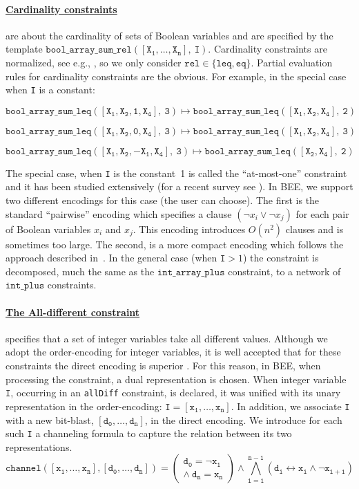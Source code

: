 \documentclass{tlp}
\newcommand{\bee}{\textsf{BEE}}
\begin{document}
\paragraph{\underline{Cardinality constraints}} are about the
cardinality of sets of Boolean variables and are specified by the
template $\mathtt{bool\_array\_sum\_rel([X_1,\ldots,X_n],~I)}$.
Cardinality constraints are normalized, see e.g., \cite{EenS06}, so we
only consider $\mathtt{rel\in\{leq,eq\}}$. Partial evaluation rules
for cardinality constraints are the obvious. For example, in the
special case when \texttt{I} is a constant:

$\mathtt{bool\_array\_sum\_leq([X_1,X_2,1,X_4],~3)\mapsto
  bool\_array\_sum\_leq([X_1,X_2,X_4],~2)}$

$\mathtt{bool\_array\_sum\_leq([X_1,X_2,0,X_4],~3)\mapsto
  bool\_array\_sum\_leq([X_1,X_2,X_4],~3)}$

$\mathtt{bool\_array\_sum\_leq([X_1,X_2,-X_1,X_4],~3)\mapsto
  bool\_array\_sum\_leq([X_2,X_4],~2)}$

\medskip\noindent 
The special case, when \texttt{I} is the constant~1 is called the
``at-most-one'' constraint and it has been studied extensively (for a
recent survey see \cite{Frisch+Giannaros/10/SAT}). In \bee, we support
two different encodings for this case (the user can choose). The first
is the standard ``pairwise'' encoding which specifies a clause $(\neg
x_i\vee\neg x_j)$ for each pair of Boolean variables $x_i$ and $x_j$.
This encoding introduces $O(n^2)$ clauses and is sometimes too large.
The second,  is a more compact encoding which follows
the approach described in~\cite{NewAtMostOne}.
In the general case (when $\mathtt{I}>1$) the constraint is
decomposed, much the same as the $\mathtt{int\_array\_plus}$
constraint, to a network of $\mathtt{int\_plus}$ constraints.

\paragraph{\underline{The All-different constraint}}
specifies that a set of integer variables take all different
values. Although we adopt the order-encoding for integer variables, it
is well accepted that for these constraints the direct encoding is
superior \cite{direct4allDiff}. For this reason, in \bee, when
processing the constraint, a dual representation is chosen.  When
integer variable $\mathtt{I}$, occurring in an \texttt{allDiff}
constraint, is declared, it was unified with its unary representation
in the order-encoding: $\mathtt{I=[x_1,\ldots,x_n]}$. In addition, we
associate \texttt{I} with a new bit-blast,
$\mathtt{[d_0,\ldots,d_{n}]}$, in the direct encoding.  We introduce
for each such \texttt{I} a channeling formula to capture the relation
between its two representations.
\[\mathtt{channel([x_1,\ldots,x_n],[d_0,\ldots,d_{n}])=
  \left(\begin{array}{r} d_0 = \neg x_1 \\
                         \wedge~ d_n = x_n
  \end{array}\right) \wedge
  \bigwedge_{i=1}^{n-1}(d_i\leftrightarrow x_{i}\wedge\neg x_{i+1})}
\]
\end{document}
